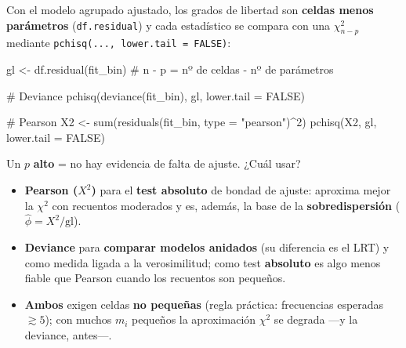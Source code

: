 \documentclass[
  letterpaper,
  DIV=11,
  numbers=noendperiod]{scrartcl}
\newenvironment{Shaded}{\begin{snugshade}}{\end{snugshade}}
\newcommand{\AttributeTok}[1]{\textcolor[rgb]{0.40,0.45,0.13}{#1}}
\newcommand{\CommentTok}[1]{\textcolor[rgb]{0.37,0.37,0.37}{#1}}
\newcommand{\ConstantTok}[1]{\textcolor[rgb]{0.56,0.35,0.01}{#1}}
\newcommand{\DecValTok}[1]{\textcolor[rgb]{0.68,0.00,0.00}{#1}}
\newcommand{\FunctionTok}[1]{\textcolor[rgb]{0.28,0.35,0.67}{#1}}
\newcommand{\NormalTok}[1]{\textcolor[rgb]{0.00,0.23,0.31}{#1}}
\newcommand{\OtherTok}[1]{\textcolor[rgb]{0.00,0.23,0.31}{#1}}
\newcommand{\SpecialCharTok}[1]{\textcolor[rgb]{0.37,0.37,0.37}{#1}}
\newcommand{\StringTok}[1]{\textcolor[rgb]{0.13,0.47,0.30}{#1}}
\providecommand{\tightlist}{%
  \setlength{\itemsep}{0pt}\setlength{\parskip}{0pt}}\usepackage{longtable,booktabs,array}
\begin{document}
\begin{tcolorbox}[enhanced jigsaw, coltitle=black, rightrule=.15mm, arc=.35mm, leftrule=.75mm, colback=white, colbacktitle=quarto-callout-tip-color!10!white, left=2mm, breakable, toptitle=1mm, toprule=.15mm, bottomtitle=1mm, titlerule=0mm, title=\textcolor{quarto-callout-tip-color}{\faLightbulb}\hspace{0.5em}{🔧 En R. El contraste χ² de bondad de ajuste (deviance y Pearson)}, bottomrule=.15mm, opacityback=0, opacitybacktitle=0.6, colframe=quarto-callout-tip-color-frame]

Con el modelo agrupado ajustado, los grados de libertad son
\textbf{celdas menos parámetros} (\texttt{df.residual}) y cada
estadístico se compara con una \(\chi^2_{n-p}\) mediante
\texttt{pchisq(...,\ lower.tail\ =\ FALSE)}:

\begin{Shaded}
\begin{Highlighting}[]
\NormalTok{gl }\OtherTok{\textless{}{-}} \FunctionTok{df.residual}\NormalTok{(fit\_bin)                       }\CommentTok{\# n {-} p = nº de celdas {-} nº de parámetros}

\CommentTok{\# Deviance}
\FunctionTok{pchisq}\NormalTok{(}\FunctionTok{deviance}\NormalTok{(fit\_bin), gl, }\AttributeTok{lower.tail =} \ConstantTok{FALSE}\NormalTok{)}

\CommentTok{\# Pearson}
\NormalTok{X2 }\OtherTok{\textless{}{-}} \FunctionTok{sum}\NormalTok{(}\FunctionTok{residuals}\NormalTok{(fit\_bin, }\AttributeTok{type =} \StringTok{"pearson"}\NormalTok{)}\SpecialCharTok{\^{}}\DecValTok{2}\NormalTok{)}
\FunctionTok{pchisq}\NormalTok{(X2, gl, }\AttributeTok{lower.tail =} \ConstantTok{FALSE}\NormalTok{)}
\end{Highlighting}
\end{Shaded}

Un \(p\) \textbf{alto} = no hay evidencia de falta de ajuste. ¿Cuál
usar?

\begin{itemize}
\tightlist
\item
  \textbf{Pearson (\(X^2\))} para el \textbf{test absoluto} de bondad de
  ajuste: aproxima mejor la \(\chi^2\) con recuentos moderados y es,
  además, la base de la \textbf{sobredispersión}
  (\(\hat\phi = X^2/\text{gl}\)).
\item
  \textbf{Deviance} para \textbf{comparar modelos anidados} (su
  diferencia es el LRT) y como medida ligada a la verosimilitud; como
  test \textbf{absoluto} es algo menos fiable que Pearson cuando los
  recuentos son pequeños.
\item
  \textbf{Ambos} exigen celdas \textbf{no pequeñas} (regla práctica:
  frecuencias esperadas \(\gtrsim 5\)); con muchos \(m_i\) pequeños la
  aproximación \(\chi^2\) se degrada ---y la deviance, antes---.
\end{itemize}

\end{tcolorbox}
\end{document}
